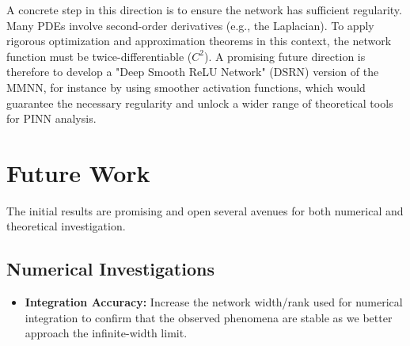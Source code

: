 \documentclass[12pt]{article}
\begin{document}
A concrete step in this direction is to ensure the network has sufficient regularity. Many PDEs involve second-order derivatives (e.g., the Laplacian). To apply rigorous optimization and approximation theorems in this context, the network function must be twice-differentiable ($C^2$). A promising future direction is therefore to develop a "Deep Smooth ReLU Network" (DSRN) version of the MMNN, for instance by using smoother activation functions, which would guarantee the necessary regularity and unlock a wider range of theoretical tools for PINN analysis.

\section{Future Work}
The initial results are promising and open several avenues for both numerical and theoretical investigation.

\subsection{Numerical Investigations}
\begin{itemize}
    \item \textbf{Integration Accuracy:} Increase the network width/rank used for numerical integration to confirm that the observed phenomena are stable as we better approach the infinite-width limit.
\end{itemize}
\end{document}
